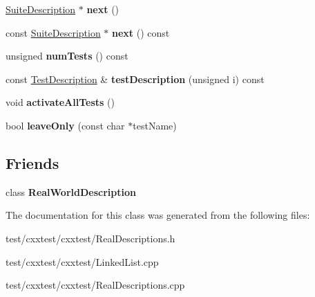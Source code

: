 \begin{DoxyCompactItemize}
\item 
\hypertarget{classCxxTest_1_1RealSuiteDescription_a676d76debefe3fa77175c88a9e720d4e}{\hyperlink{classCxxTest_1_1SuiteDescription}{Suite\-Description} $\ast$ {\bfseries next} ()}\label{classCxxTest_1_1RealSuiteDescription_a676d76debefe3fa77175c88a9e720d4e}

\item 
\hypertarget{classCxxTest_1_1RealSuiteDescription_ad994243c5812bf505da82d5bc54fd29c}{const \hyperlink{classCxxTest_1_1SuiteDescription}{Suite\-Description} $\ast$ {\bfseries next} () const }\label{classCxxTest_1_1RealSuiteDescription_ad994243c5812bf505da82d5bc54fd29c}

\item 
\hypertarget{classCxxTest_1_1RealSuiteDescription_a4052c11718fddb9bebe0c36a854aaa03}{unsigned {\bfseries num\-Tests} () const }\label{classCxxTest_1_1RealSuiteDescription_a4052c11718fddb9bebe0c36a854aaa03}

\item 
\hypertarget{classCxxTest_1_1RealSuiteDescription_aa3b52049e0578a723d17e2cade43b41b}{const \hyperlink{classCxxTest_1_1TestDescription}{Test\-Description} \& {\bfseries test\-Description} (unsigned i) const }\label{classCxxTest_1_1RealSuiteDescription_aa3b52049e0578a723d17e2cade43b41b}

\item 
\hypertarget{classCxxTest_1_1RealSuiteDescription_af488afa24150ddd0a13790438fcfb798}{void {\bfseries activate\-All\-Tests} ()}\label{classCxxTest_1_1RealSuiteDescription_af488afa24150ddd0a13790438fcfb798}

\item 
\hypertarget{classCxxTest_1_1RealSuiteDescription_a1843823285947bf9127b9aa594660c04}{bool {\bfseries leave\-Only} (const char $\ast$test\-Name)}\label{classCxxTest_1_1RealSuiteDescription_a1843823285947bf9127b9aa594660c04}

\end{DoxyCompactItemize}
\subsection*{Friends}
\begin{DoxyCompactItemize}
\item 
\hypertarget{classCxxTest_1_1RealSuiteDescription_ab20581a17b362b2aaef10399b05bb5d8}{class {\bfseries Real\-World\-Description}}\label{classCxxTest_1_1RealSuiteDescription_ab20581a17b362b2aaef10399b05bb5d8}

\end{DoxyCompactItemize}


The documentation for this class was generated from the following files\-:\begin{DoxyCompactItemize}
\item 
test/cxxtest/cxxtest/Real\-Descriptions.\-h\item 
test/cxxtest/cxxtest/Linked\-List.\-cpp\item 
test/cxxtest/cxxtest/Real\-Descriptions.\-cpp\end{DoxyCompactItemize}
